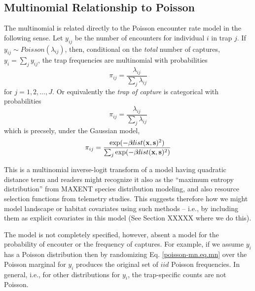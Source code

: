 \subsection{Multinomial Relationship to Poisson}

The multinomial is related directly to the Poisson encounter rate
model in the following sense. Let $y_{ij}$ be the number of
encounters for individual $i$ in trap $j$. If $y_{ij} \sim
Poisson(\lambda_{ij})$,
then, 
conditional on the {\it total}
number of captures, $y_{i} = \sum_{j} y_{ij}$, the trap frequencies are multinomial with
probabilities
\[
 \pi_{ij} =  \frac{ \lambda_{ij} } { \sum_{j} \lambda_{ij} } 
\]
for $j=1,2,\ldots,J$.
Or equivalently the {\it trap of
  capture} is categorical with probabilities
\[
 \pi_{ij} =  \frac{ \lambda_{ij} } { \sum_{j} \lambda_{ij} } 
\]
which is precsely, under the Gaussian model, 
\begin{equation} 
\pi_{ij} =  \frac{ \exp( - \beta \! dist({\bf x},{\bf s})^2 ) }  {
   \sum_{j} \exp(-\beta \! dist({\bf x},{\bf s})^2)}
\label{poisson-mn.eq.mnprobs}
\end{equation}

This is a multinomial inverse-logit transform of a model having
quadratic distance term and readers might recognize it
also as the ``maximum entropy distribution'' from MAXENT
species distribution modeling, and also resource selection functions
from telemetry studies. This suggests therefore how we might model
landscape or habitat covariates using such methods -- i.e., by
including them as explicit covariates in this model (See Section XXXXX
where we do this).  

The model is not completely specified, however, absent a model for the
probability of encouter or the frequency of captures. For example, if
we assume $y_{i}$ has a Poisson distribution then by randomizing
Eq. \ref{poisson-mn.eq.mn}
over the Poisson marginal for 
$y_{i}$ produces the original set of $iid$ Poisson frequencies. In
general, i.e., for other distributions for $y_{i}$, the trap-specific
counts are not Poisson.


